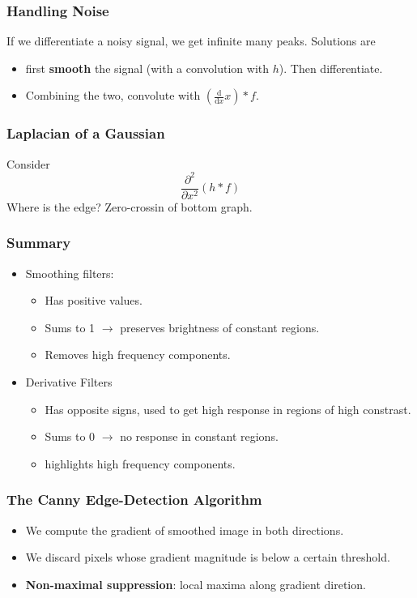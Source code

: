 \documentclass[a4paper,12 pt]{article}
\theoremstyle{definition}
\theoremstyle{remark}
\theoremstyle{definition}
\theoremstyle{definition}
\theoremstyle{definition}
\theoremstyle{remark}
\theoremstyle{definition}
\begin{document}
\subsubsection*{Handling Noise}
If we differentiate a noisy signal, we get infinite many peaks. Solutions are 
\begin{itemize}
\item first \textbf{smooth} the signal (with a convolution with $h$). Then differentiate.
\item Combining the two, convolute with $(\frac{\text{d}}{\text{d}x}x)*f$.
\end{itemize}
\subsubsection*{Laplacian of a Gaussian}
Consider
\begin{equation}
\frac{\partial ^2}{\partial x^2}(h *f)
\end{equation}
Where is the edge? Zero-crossin of bottom graph.
\subsubsection*{Summary}
\begin{itemize}
\item Smoothing filters:
\begin{itemize}
\item Has positive values.
\item Sums to 1 $\rightarrow$ preserves brightness of constant regions.
\item Removes high frequency components.
\end{itemize}
\item Derivative Filters
\begin{itemize}
\item Has opposite signs, used to get high response in regions of high constrast.
\item Sums to 0 $\rightarrow$ no response in constant regions.
\item highlights high frequency components.
\end{itemize}
\end{itemize}
\subsubsection*{The Canny Edge-Detection Algorithm}
\begin{itemize}
\item We compute the gradient of smoothed image in both directions. 
\item We discard pixels whose gradient magnitude is below a certain threshold.
\item \textbf{Non-maximal suppression}: local maxima along gradient diretion.
\end{itemize}
\newpage
\end{document}
